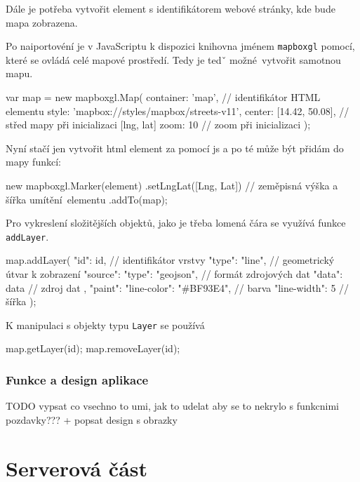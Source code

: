 \bigbreak

Dále je potřeba vytvořit element s identifikátorem webové stránky, kde bude mapa zobrazena.

\bigbreak

Po naiportovéní je v JavaScriptu k dispozici knihovna jménem \verb-mapboxgl- pomocí, které se ovládá celé mapové prostředí. Tedy je tedˇ možné vytvořit samotnou mapu.
\begin{code}[frame=none]
var map = new mapboxgl.Map({
	container: 'map', // identifikátor HTML elementu
	style: 'mapbox://styles/mapbox/streets-v11',
	center: [14.42, 50.08], // střed mapy při
		inicializaci [lng, lat]
	zoom: 10 // zoom při inicializaci
});
\end{code}

\bigbreak

Nyní stačí jen vytvořit \gls{html} element za pomocí \gls{js} a po té může být přidám do mapy funkcí:
\begin{code}[frame=none]
new mapboxgl.Marker(element)
	.setLngLat([Lng, Lat]) // zeměpisná výška a šířka
		umítění elementu
	.addTo(map);
\end{code}

\bigbreak

Pro vykreslení složitějších objektů, jako je třeba lomená čára se využívá funkce \verb-addLayer-.
\begin{code}[frame=none]
map.addLayer({
	"id": id, // identifikátor vrstvy
	"type": "line", // geometrický útvar k zobrazení
	"source": {
		"type": "geojson", // formát zdrojových dat
		"data": data // zdroj dat
	},
	"paint": {
		"line-color": "#BF93E4", // barva
		"line-width": 5 // šířka
	}
});
\end{code}

\bigbreak

K manipulaci s objekty typu \verb-Layer- se používá
\begin{code}[frame=none]
map.getLayer(id);
map.removeLayer(id);
\end{code}

\subsubsection{Funkce a design aplikace}

TODO vypsat co vsechno to umi, jak to udelat aby se to nekrylo s funkcnimi pozdavky??? + popsat design s obrazky


\section{Serverová část}

